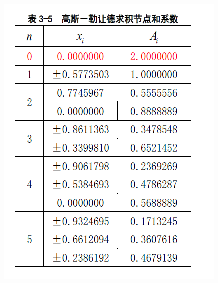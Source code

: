 \documentclass{article}                          %
\numberwithin{equation}{subsection}              %
\begin{document}
\begin{figure}
	\centering
	\includegraphics{xishu.png}
\end{figure}
\end{document}
